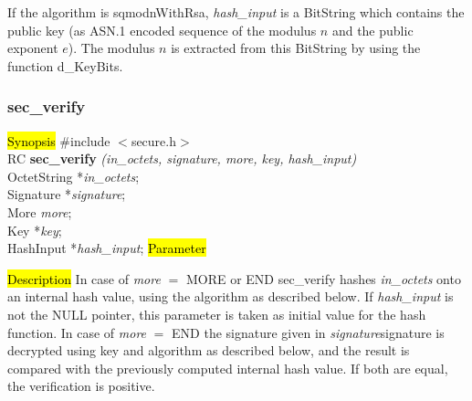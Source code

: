 If the algorithm is sqmodnWithRsa, {\em hash\_input} is a BitString which contains the 
public key (as ASN.1 encoded sequence of the modulus $n$ and the public
exponent $e$). The modulus $n$ is extracted from this BitString by using the function
d\_KeyBits.

\subsubsection{sec\_verify}
\label{sec_verify}
\hl{Synopsis}
\#include $<$secure.h$>$ \\ [0.5cm]
RC {\bf sec\_verify} {\em (in\_octets, signature, more, key, hash\_input)} \\
OctetString *{\em in\_octets}; \\
Signature *{\em signature}; \\
More {\em more}; \\
Key *{\em key}; \\
HashInput *{\em hash\_input};
\hl{Parameter}





\hl{Description}
In case of {\em more} $=$ MORE or END sec\_verify hashes {\em in\_octets} onto
an internal hash value, using the algorithm as described below.
If {\em hash\_input} is not the NULL pointer, this parameter is taken
as initial value for the hash function.
In case of {\em more} $=$ END the signature given in {\em signature}\pf signature
is decrypted using key and algorithm as described below, and the result is compared
with the previously computed internal hash value. If both are equal, the verification
is positive. 

